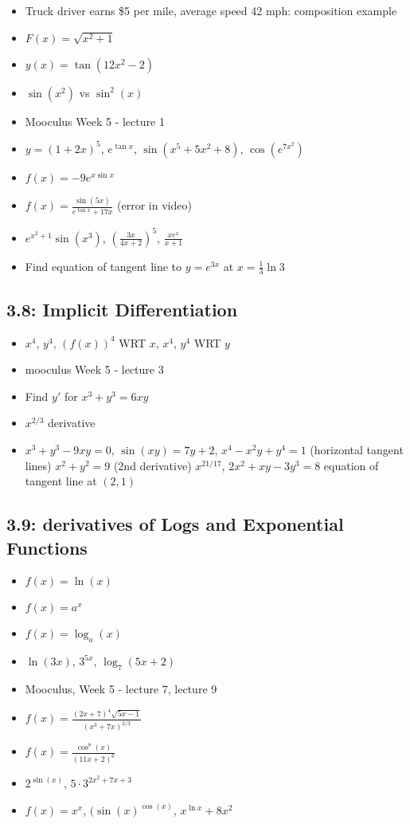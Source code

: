 \documentclass[11pt]{article}
\begin{document}
\begin{itemize}
	\item Truck driver earns \$5 per mile, average speed 42 mph: composition example
	\item $F(x) = \sqrt{x^2 +1}$
	\item $y(x) = \tan(12x^2 - 2)$
	\item $\sin(x^2)$ vs $\sin^2(x)$
	\item Mooculus Week 5 - lecture 1
	\item $y = (1 + 2x)^5$, $e^{\tan x}$, $\sin(x^5 + 5x^2 + 8)$, $\cos (e^{7x^2})$
	\item $f(x) = -9e^{x \sin x}$
	\item $f(x) = \frac{\sin(5x)}{e^{\tan x} + 17x}$ (error in video)
	\item $e^{x^2 + 1}\sin(x^3)$, $\left ( \frac{3x}{4x+2} \right ) ^5$, $\frac{xe^x}{x+1}$
	\item Find equation of tangent line to $y = e^{3x}$ at $x = \frac13\ln 3$
\end{itemize}

\subsection{3.8: Implicit Differentiation}

\begin{itemize}
	\item $x^4$, $y^4$, $(f(x))^4$ WRT $x$, $x^4$, $y^4$ WRT $y$
	\item mooculus Week 5 - lecture 3
	\item Find $y'$ for $x^3 + y^3 = 6xy$
	\item $x^{2/3}$ derivative
	\item $x^3 +y^3 - 9xy = 0$, $\sin(xy) = 7y+2$, $x^4 - x^2y + y^4 = 1$ (horizontal tangent lines) $x^2 + y^2 = 9$ (2nd derivative) $x^{21/17}$, $2x^2 + xy - 3y^3 = 8$ equation of tangent line at $(2,1)$
\end{itemize}

\subsection{3.9: derivatives of Logs and Exponential Functions}

\begin{itemize}
	\item $f(x) = \ln(x)$
	\item $f(x) = a^x$
	\item $f(x) = \log_a(x)$
	\item $\ln(3x)$, $3^{5x}$, $\log_7(5x+2)$
	\item Mooculus, Week 5 - lecture 7, lecture 9
	\item $f(x) = \frac{(2x+7)^4 \sqrt{5x-1}}{(x^3 + 7x)^{2/3}}$
	\item $f(x) = \frac{\cos^8(x)}{(11x+2)^6}$
	\item $2^{\sin(x)}$, $5 \cdot 3^{2x^2 + 7x+3}$
	\item $f(x) = x^x$, $(\sin(x)^{\cos(x)}$, $x^{\ln x} + 8x^2$
\end{itemize}
\end{document}
